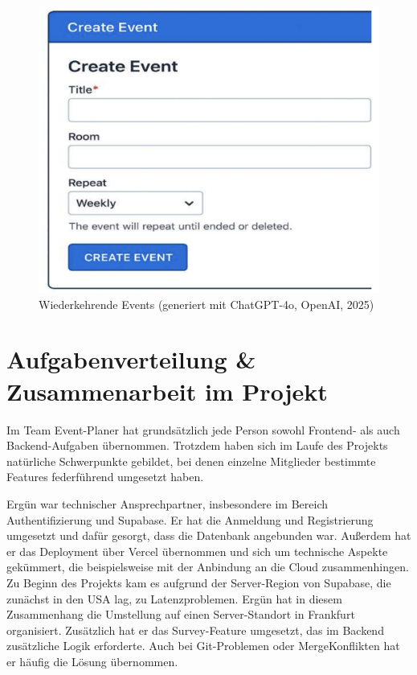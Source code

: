 \documentclass[a4paper,12pt]{article}
\begin{document}
\begin{figure}[H]
    \centering
    \includegraphics[width=1\textwidth]{Abbildungen/wiederkehrende_events.png}
    \caption{Wiederkehrende Events (generiert mit ChatGPT-4o, OpenAI, 2025)}
    \label{fig:wiederkehrende_events}
\end{figure}

\newpage


\section{Aufgabenverteilung \& Zusammenarbeit im Projekt}

Im Team Event-Planer hat grundsätzlich jede Person sowohl Frontend- als auch Backend-Aufgaben übernommen. Trotzdem haben sich im Laufe des Projekts natürliche Schwerpunkte gebildet, bei denen einzelne Mitglieder bestimmte Features federführend umgesetzt haben. 

Ergün war technischer Ansprechpartner, insbesondere im Bereich Authentifizierung und Supabase. Er hat die Anmeldung und Registrierung umgesetzt und dafür gesorgt, dass die Datenbank angebunden war. Außerdem hat er das \gls{Deployment} über \gls{Vercel} übernommen und sich um technische Aspekte gekümmert, die beispielsweise mit der Anbindung an die Cloud zusammenhingen. Zu Beginn des Projekts kam es aufgrund der Server-Region von Supabase, die zunächst in den USA lag, zu Latenzproblemen. Ergün hat in diesem Zusammenhang die Umstellung auf einen Server-Standort in Frankfurt organisiert. Zusätzlich hat er das Survey-Feature umgesetzt, das im Backend zusätzliche Logik erforderte. Auch bei Git-Problemen oder MergeKonflikten hat er häufig die Lösung übernommen.
\end{document}
